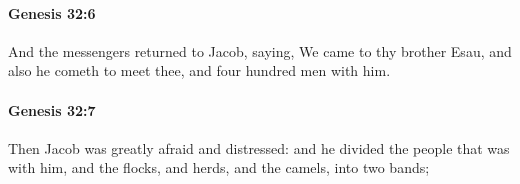 		\paragraph{Genesis 32:6} %
			\label{GENESIS-32-6}

			And the messengers returned to Jacob, saying, We came to thy brother Esau, and also he cometh to meet thee, and four hundred men with him.


		\paragraph{Genesis 32:7} %
			\label{GENESIS-32-7}

			Then Jacob was greatly afraid and distressed: and he divided the people that was with him, and the flocks, and herds, and the camels, into two bands;


